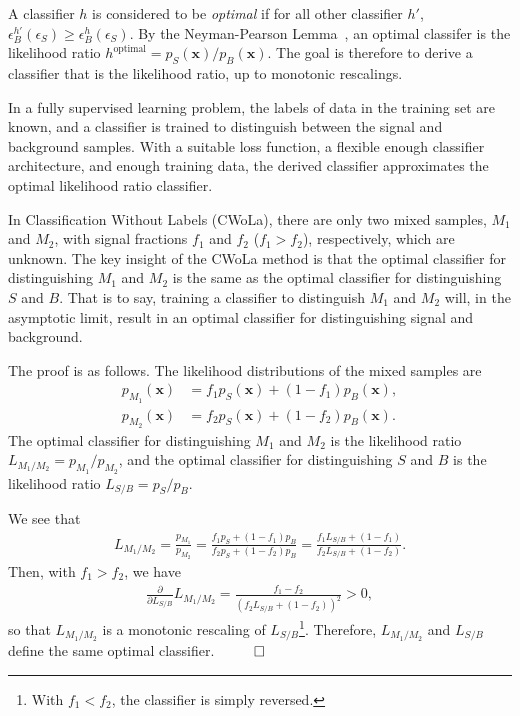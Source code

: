 A classifier $h$ is considered to be \textit{optimal} if for all other classifier $h'$, $\epsilon_B^{h'}(\epsilon_S) \geq \epsilon_B^{h}(\epsilon_S)$.
By the Neyman-Pearson Lemma~\cite{neyman1933ix}, an optimal classifer is the likelihood ratio $h^\text{optimal} = p_S(\mathbf{x})/p_B(\mathbf{x})$.
The goal is therefore to derive a classifier that is the likelihood ratio, up to monotonic rescalings.

In a fully supervised learning problem, the labels of data in the training set are known, and a classifier is trained to distinguish between the signal and background samples.
With a suitable loss function, a flexible enough classifier architecture, and enough training data, the derived classifier approximates the optimal likelihood ratio classifier.

In Classification Without Labels (CWoLa), there are only two mixed samples, $M_1$ and $M_2$, with signal fractions $f_1$ and $f_2$ ($f_1>f_2$), respectively, which are unknown.
The key insight of the CWoLa method is that the optimal classifier for distinguishing $M_1$ and $M_2$ is the same as the optimal classifier for distinguishing $S$ and $B$.
That is to say, training a classifier to distinguish $M_1$ and $M_2$ will, in the asymptotic limit, result in an optimal classifier for distinguishing signal and background.

The proof is as follows.
The likelihood distributions of the mixed samples are
\begin{align}
  p_{M_1}(\mathbf{x}) &= f_1p_S(\mathbf{x})+(1-f_1)p_B(\mathbf{x}),\\
  p_{M_2}(\mathbf{x}) &= f_2p_S(\mathbf{x})+(1-f_2)p_B(\mathbf{x}).
\end{align}
The optimal classifier for distinguishing $M_1$ and $M_2$ is the likelihood ratio $L_{M_1/M_2} = p_{M_1}/p_{M_2}$, and the optimal classifier for distinguishing $S$ and $B$ is the likelihood ratio $L_{S/B} = p_S/p_B$.

We see that
\begin{align}
L_{M_1/M_2} = \frac{p_{M_1}}{p_{M_2}} = \frac{f_1p_S+(1-f_1)p_B}{f_2p_S+(1-f_2)p_B} = \frac{f_1L_{S/B}+(1-f_1)}{f_2L_{S/B}+(1-f_2)}.
\end{align}
Then, with $f_1>f_2$, we have
\begin{align}
\frac{\partial}{\partial L_{S/B}}L_{M_1/M_2} = \frac{f_1-f_2}{(f_2L_{S/B}+(1-f_2))^2} > 0,
\end{align}
so that $L_{M_1/M_2}$ is a monotonic rescaling of $L_{S/B}$\footnote{With $f_1<f_2$, the classifier is simply reversed.}.
Therefore, $L_{M_1/M_2}$ and $L_{S/B}$ define the same optimal classifier.$\hspace{1 cm}\Box$

